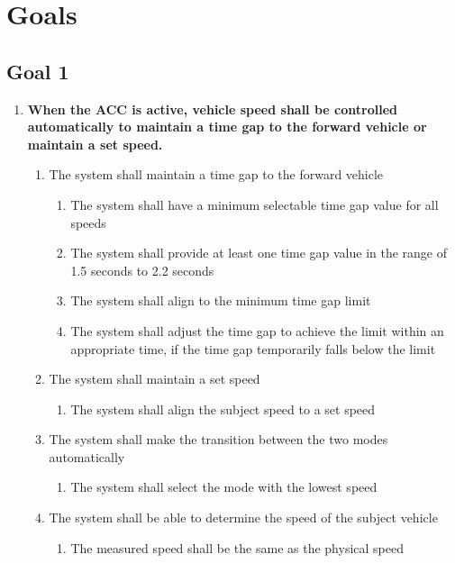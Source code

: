 \section{Goals}

\subsection{Goal 1}

\begin{enumerate}
    \item {\bf When the ACC is active, vehicle speed shall be controlled automatically to maintain a time gap to the forward vehicle or maintain a set speed.}
    \begin{enumerate}[label*=\arabic*]
        \item The system shall maintain a time gap to the forward vehicle
        \begin{enumerate}[label*=\arabic*]
            \item The system shall have a minimum selectable time gap value for all speeds
            \item The system shall provide at least one time gap value in the range of 1.5 seconds to 2.2 seconds
            \item The system shall align to the minimum time gap limit
            \item The system shall adjust the time gap to achieve the limit within an appropriate time, if the time gap temporarily falls below the limit
        \end{enumerate}
        \item The system shall maintain a set speed
        \begin{enumerate}[label*=\arabic*]
            \item The system shall align the subject speed to a set speed
        \end{enumerate}
        \item The system shall make the transition between the two modes automatically
        \begin{enumerate}[label*=\arabic*]
            \item{The system shall select the mode with the lowest speed}
        \end{enumerate}
        \item{The system shall be able to determine the speed of the subject vehicle}
        \begin{enumerate}[label*=\arabic*]
            \item{The measured speed shall be the same as the physical speed}

\end{enumerate}
\end{enumerate}
\end{enumerate}
